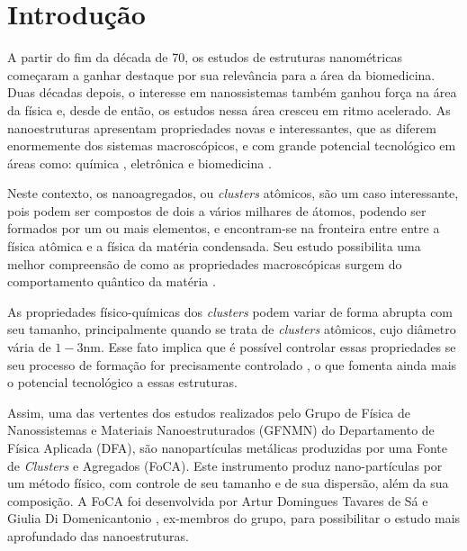 \chapter{Introdução}

A partir do fim da década de 70, os estudos de estruturas nanométricas começaram a ganhar destaque por sua relevância para a área da biomedicina. Duas décadas depois, o interesse em nanossistemas também ganhou força na área da física e, desde de então, os estudos nessa área cresceu em ritmo acelerado. As nanoestruturas apresentam propriedades novas e interessantes, que as diferem enormemente dos sistemas macroscópicos, e com grande potencial tecnológico em áreas como: química \cite{catalise}, eletrônica \cite{semicondutores} e biomedicina \cite{antimicrobial_effects, drug_delivery}.


Neste contexto, os nanoagregados, ou \textit{clusters} atômicos, são um caso interessante, pois podem ser compostos de dois a vários milhares de átomos, podendo ser formados por um ou mais elementos, e encontram-se na fronteira entre entre a física atômica e a física da matéria condensada.
Seu estudo possibilita uma melhor compreensão de como as propriedades macroscópicas surgem do comportamento quântico da matéria \cite{Heer,Brack}.

As propriedades físico-químicas dos \textit{clusters} podem variar de forma abrupta com seu tamanho, principalmente quando se trata de \textit{clusters} atômicos, cujo diâmetro vária de $1-3$nm. Esse fato implica que é possível controlar essas propriedades se seu processo de formação for precisamente controlado  \cite{energetic_thermodynamic}, o que fomenta ainda mais o potencial tecnológico a essas estruturas.


Assim, uma das vertentes dos estudos realizados pelo Grupo   de   Física   de   Nanossistemas   e Materiais  Nanoestruturados  (GFNMN)  do  Departamento de  Física  Aplicada  (DFA),  são nanopartículas metálicas produzidas por uma Fonte de \textit{Clusters} e Agregados (FoCA). Este instrumento produz nano-partículas por um método físico, com controle de seu tamanho e de sua dispersão, além da sua composição. A FoCA foi desenvolvida por Artur Domingues Tavares de Sá e Giulia Di Domenicantonio \cite{tese_artur}, ex-membros do grupo, para possibilitar o estudo mais aprofundado das nanoestruturas.

